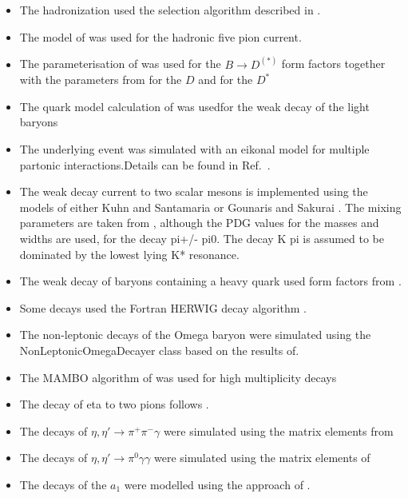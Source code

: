 \documentclass{article}
\begin{document}
\begin{itemize}
\item The hadronization used the selection algorithm described in \cite{Kupco:1998fx}.
\item The model of \cite{Kuhn:2006nw} was used for the hadronic five pion current.
\item The parameterisation of \cite{Caprini:1997mu} was used for the $B\to D^{(*)}$ form factors together with the parameters from\cite{Snyder:2007qn} for the $D$ and \cite{Aubert:2007rs} for the $D^*$
\item The quark model calculation of \cite{Schlumpf:1994fb} was usedfor the weak decay of the light baryons
\item The underlying event was simulated with an eikonal model for multiple partonic interactions.Details can be found in Ref.~\cite{Bahr:2008dy,Bahr:2009ek}.
\item The weak decay current to two scalar mesons is implemented using the models of either Kuhn and Santamaria \cite{Kuhn:1990ad} or Gounaris and Sakurai \cite{Gounaris:1968mw}. The mixing parameters are taken from \cite{Asner:1999kj}, although the PDG values for the masses and widths are used, for the decay pi+/- pi0. The decay K pi is assumed to  be dominated by the lowest lying K* resonance.
\item The weak decay of baryons containing a heavy quark used form factors from \cite{Cheng:1995fe,Cheng:1996cs}.
\item Some decays used the Fortran HERWIG decay algorithm \cite{Corcella:2000bw}.
\item The  non-leptonic decays of the Omega baryon were simulated using the NonLeptonicOmegaDecayer class based on the results of\cite{Borasoy:1999ip}.
\item The MAMBO algorithm of \cite{Kleiss:1991rn} was used for high multiplicity decays
\item The decay of eta to two pions follows \cite{Beisert:2003zs,Gormley:1970qz,Tippens:2001fm}.
\item The decays of $\eta,\eta'\to\pi^+\pi^-\gamma$ were simulated using the matrix elements from \cite{Venugopal:1998fq,Holstein:2001bt}
\item The decays of $\eta,\eta'\to\pi^0\gamma\gamma$ were simulated using the matrix elements of \cite{Holstein:2001bt}
\item The decays of the $a_1$ were modelled using the approach of \cite{Kuhn:1990ad}.


\end{itemize}
\end{document}
